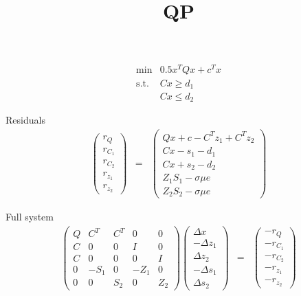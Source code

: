 \documentclass[a4paper]{paper}
\author{}
\date{}
\title{QP}
\begin{document}
\[
\begin{array}{lc}
\min & 0.5 x^T Q x + c^T x\\
\mathrm{s.t.} & C x \geq d_1\\
              & C x \leq d_2
\end{array}
\]

Residuals
\begin{eqnarray*}
\left(\begin{array}{c}
r_Q\\
r_{C_1}\\
r_{C_2}\\
r_{z_1}\\
r_{z_2}
\end{array}\right)
&=&
\left(\begin{array}{c}
Qx + c - C^T z_1 + C^T z_2\\
Cx - s_1 - d_1\\
Cx + s_2 - d_2\\
Z_1 S_1 - \sigma \mu e\\
Z_2 S_2 - \sigma \mu e
\end{array}\right)
\end{eqnarray*}

Full system
\begin{eqnarray*}
\left(\begin{array}{ccccc}
Q & C^T & C^T & 0 & 0\\
C & 0   & 0   & I & 0\\
C & 0   & 0   & 0 & I\\
0 & -S_1 & 0   & -Z_1 & 0\\
0 & 0   & S_2   & 0 & Z_2
\end{array}\right)
\left(\begin{array}{c}
\Delta x\\
-\Delta z_1\\
\Delta z_2\\
-\Delta s_1\\
\Delta s_2
\end{array}\right)
&=&
\left(\begin{array}{c}
-r_Q\\
-r_{C_1}\\
-r_{C_2}\\
-r_{z_1}\\
-r_{z_2}
\end{array}\right)
\end{eqnarray*}
\end{document}
